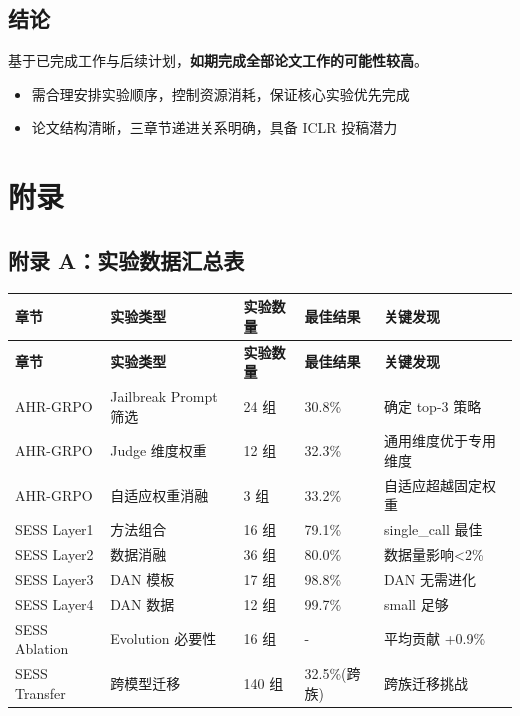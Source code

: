 \documentclass[12pt,a4paper]{article}
\newcommand{\success}[1]{\textcolor{successgreen}{#1}}
\begin{document}
\subsection{结论}

\begin{tcolorbox}[colback=lightestblue!30,colframe=primaryblue,title=结论]
    基于已完成工作与后续计划，\success{\textbf{如期完成全部论文工作的可能性较高}}。
    
    \vspace{0.5em}
    
    \begin{itemize}
        \item 需合理安排实验顺序，控制资源消耗，保证核心实验优先完成
        \item 论文结构清晰，三章节递进关系明确，具备 ICLR 投稿潜力
    \end{itemize}
\end{tcolorbox}

\newpage
\appendix
\section{附录}

\subsection{附录 A：实验数据汇总表}

\begin{longtable}{@{}l l l l l@{}}
    \toprule
    \rowcolor{tableheader}
    \textbf{章节} & \textbf{实验类型} & \textbf{实验数量} & \textbf{最佳结果} & \textbf{关键发现} \\
    \midrule
    \endfirsthead
    
    \toprule
    \rowcolor{tableheader}
    \textbf{章节} & \textbf{实验类型} & \textbf{实验数量} & \textbf{最佳结果} & \textbf{关键发现} \\
    \midrule
    \endhead
    
    \bottomrule
    \endfoot
    
    AHR-GRPO & Jailbreak Prompt 筛选 & 24 组 & 30.8\% & 确定 top-3 策略 \\
    AHR-GRPO & Judge 维度权重 & 12 组 & 32.3\% & 通用维度优于专用维度 \\
    AHR-GRPO & 自适应权重消融 & 3 组 & 33.2\% & 自适应超越固定权重 \\
    SESS Layer1 & 方法组合 & 16 组 & 79.1\% & single\_call 最佳 \\
    SESS Layer2 & 数据消融 & 36 组 & 80.0\% & 数据量影响<2\% \\
    SESS Layer3 & DAN 模板 & 17 组 & 98.8\% & DAN 无需进化 \\
    SESS Layer4 & DAN 数据 & 12 组 & 99.7\% & small 足够 \\
    SESS Ablation & Evolution 必要性 & 16 组 & - & 平均贡献 +0.9\% \\
    SESS Transfer & 跨模型迁移 & 140 组 & 32.5\%(跨族) & 跨族迁移挑战 \\
\end{longtable}
\end{document}
